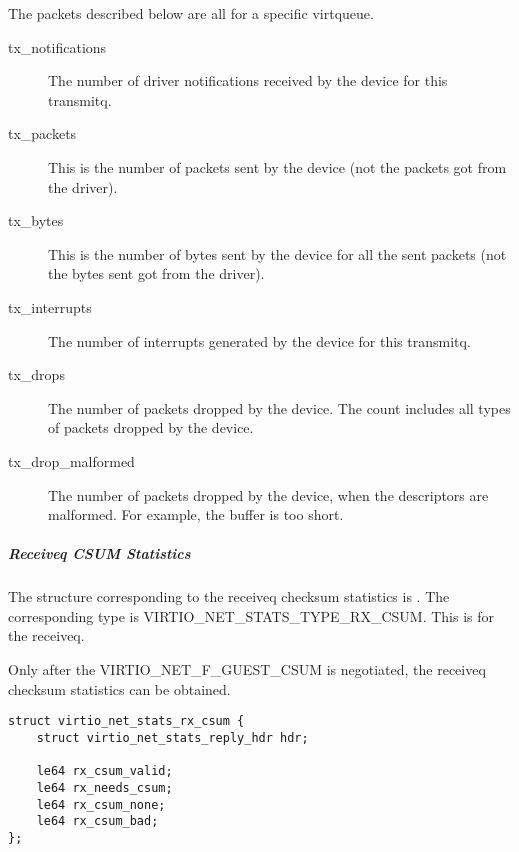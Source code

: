 The packets described below are all for a specific virtqueue.
\begin{description}
    \item [tx_notifications]
        The number of driver notifications received by the device for this
        transmitq.

    \item [tx_packets]
        This is the number of packets sent by the device (not the packets
        got from the driver).

    \item [tx_bytes]
        This is the number of bytes sent by the device for all the sent packets
        (not the bytes sent got from the driver).

    \item [tx_interrupts]
        The number of interrupts generated by the device for this transmitq.

    \item [tx_drops]
        The number of packets dropped by the device. The count includes all
        types of packets dropped by the device.

    \item [tx_drop_malformed]
        The number of packets dropped by the device, when the descriptors are
        malformed. For example, the buffer is too short.
\end{description}

\subparagraph{Receiveq CSUM Statistics}\label{sec:Device Types / Network Device / Device Operation / Control Virtqueue / Device Statistics / Receiveq CSUM Statistics}

The structure corresponding to the receiveq checksum statistics is
. The corresponding type is
VIRTIO_NET_STATS_TYPE_RX_CSUM. This is for the receiveq.

Only after the VIRTIO_NET_F_GUEST_CSUM is negotiated, the receiveq checksum
statistics can be obtained.

\begin{lstlisting}
struct virtio_net_stats_rx_csum {
    struct virtio_net_stats_reply_hdr hdr;

    le64 rx_csum_valid;
    le64 rx_needs_csum;
    le64 rx_csum_none;
    le64 rx_csum_bad;
};
\end{lstlisting}

